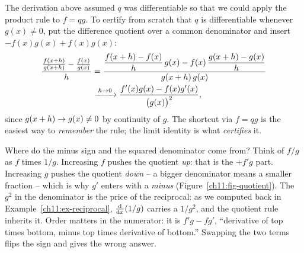 \begin{remark}
The derivation above assumed $q$ was differentiable so that we could apply the
product rule to $f=qg$. To certify from scratch that $q$ is differentiable whenever
$g(x)\ne 0$, put the difference quotient over a common denominator and insert
$-f(x)g(x)+f(x)g(x)$:
\begin{align*}
  \frac{\frac{f(x+h)}{g(x+h)} - \frac{f(x)}{g(x)}}{h}
  &= \frac{\dfrac{f(x+h)-f(x)}{h}\,g(x) - f(x)\,\dfrac{g(x+h)-g(x)}{h}}{g(x+h)\,g(x)} \\
  &\xrightarrow{\;h\to 0\;} \frac{f'(x)g(x)-f(x)g'(x)}{\big(g(x)\big)^2},
\end{align*}
since $g(x+h)\to g(x)\ne 0$ by continuity of $g$. The shortcut via $f=qg$ is the easiest
way to \emph{remember} the rule; the limit identity is what \emph{certifies} it.
\end{remark}

\begin{whybox}
Where do the minus sign and the squared denominator come from?
Think of $f/g$ as $f$ times $1/g$. Increasing $f$ pushes the quotient \emph{up}: that is
the $+f' g$ part. Increasing $g$ pushes the quotient \emph{down} -- a bigger denominator
means a smaller fraction -- which is why $g'$ enters with a \emph{minus}
(Figure~\ref{ch11:fig-quotient}). The
$g^2$ in the denominator is the price of the reciprocal: as we computed back in
Example~\ref{ch11:ex-reciprocal}, $\frac{\mathrm{d}}{\mathrm{d} x}\!\left(1/g\right)$ carries a $1/g^2$, and the quotient rule
inherits it. Order matters in the numerator: it is $f'g - fg'$, ``derivative of top times
bottom, minus top times derivative of bottom.'' Swapping the two terms flips the sign and
gives the wrong answer.
\end{whybox}


